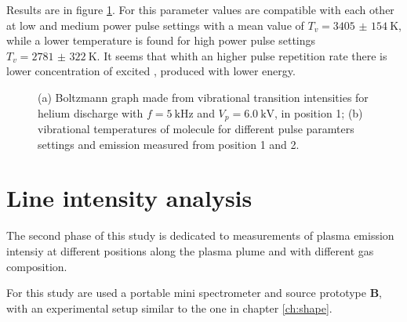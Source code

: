 Results are in figure \ref{fig:TvN2}. For this parameter values are compatible with each other at low and medium power pulse settings with a mean value of $T_v = \SI{3405(154)}{\kelvin}$, while a lower temperature is found for high power pulse settings $T_v = \SI{2781(322)}{\kelvin}$. It seems that whith an higher pulse repetition rate there is lower concentration of excited , produced with lower energy.
\begin{figure}
\centering
  \hfill
  \caption{(a) Boltzmann graph made from  vibrational transition intensities for helium discharge with $f = \SI{5}{\kilo\hertz}$ and $V_p = \SI{6.0}{\kilo\volt}$, in position 1; (b) vibrational temperatures of  molecule for different pulse paramters settings and emission measured from position 1 and 2.}
  \label{fig:TvN2}
\end{figure}


\section{Line intensity analysis}
The second phase of this study is dedicated to measurements of plasma emission intensiy at different positions along the plasma plume and with different gas composition.

For this study are used a portable mini spectrometer and source prototype \textbf{B}, with an experimental setup similar to the one in chapter \ref{ch:shape}. 

